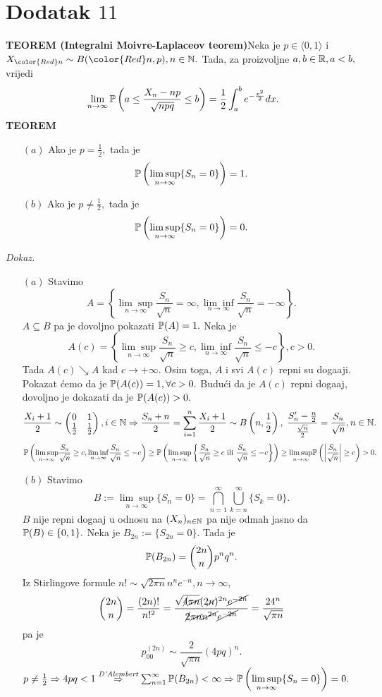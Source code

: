 \documentclass{article}
\newcommand{\mylimsup}{\underset{n\to\infty}{\lim\sup}}
\newcommand{\myliminf}{\underset{n\to\infty}{\lim\inf}}
\begin{document}
\section{Dodatak \(11\)}
\textbf{TEOREM (Integralni Moivre-Laplaceov teorem)}\newline Neka je \(p\in\langle 0,1\rangle\) i \(X_{\color{Red}n}\sim B({\color{Red}n},p),n\in\Bbb N.\) Tada, za proizvoljne \(a,b\in\Bbb R,a<b,\) vrijedi \[\lim_{n\to\infty}\Bbb P\left(a\le\frac{X_n-np}{\sqrt{npq}}\le b\right)=\frac12\int_a^b e^{-\frac{x^2}2}dx.\] 
\textbf{TEOREM}
\begin{enumerate}
    \item[\((a)\)] Ako je \(p=\frac12,\) tada je \[\Bbb P\left(\mylimsup \{S_n=0\}\right)=1.\]
    \item[\((b)\)] Ako je \(p\ne\frac12,\) tada je \[\Bbb P\left(\mylimsup \{S_n=0\}\right)=0.\]
\end{enumerate}
\textit{Dokaz.}\newline
\begin{enumerate}
    \item[\((a)\)] Stavimo \[A=\left\{\mylimsup \frac{S_n}{\sqrt n}=\infty,\myliminf \frac{S_n}{\sqrt n}=-\infty\right\}.\] \(A\subseteq B\) pa je dovoljno pokazati \(\Bbb P(A)=1.\) Neka je \[A(c)=\left\{\mylimsup \frac{S_n}{\sqrt n}\ge c,\myliminf \frac{S_n}{\sqrt n}\le -c\right\},c>0.\] Tada \(A(c)\searrow A\) kad \(c\to+\infty.\) Osim toga, \(A\) i svi \(A(c)\) repni su doga\dj{}aji. Pokazat ćemo da je \(\Bbb P(A(c))=1,\forall c>0.\) Budući da je \(A(c)\) repni doga\dj{}aj, dovoljno je dokazati da je \(\Bbb P(A(c))>0.\) \[\frac{X_i+1}2\sim\begin{pmatrix}0&1\\\frac12&\frac12\end{pmatrix},i\in\Bbb N\Rightarrow\frac{S_n+n}2=\sum_{i=1}^n\frac{X_i+1}2\sim B\left(n,\frac12\right),\;\frac{S_n'-\frac{n}2}{\frac{\sqrt n}2}=\frac{S_n}{\sqrt n},n\in\Bbb N.\] \[\Bbb P\left(\mylimsup \frac{S_n}{\sqrt n}\ge c,\myliminf \frac{S_n}{\sqrt n}\le -c\right)\ge\Bbb P\left(\mylimsup \left\{\frac{S_n}{\sqrt n}\ge c\text{ ili }\frac{S_n}{\sqrt n}\le -c\right\}\right)\ge\mylimsup \Bbb P\left(\left|\frac{S_n}{\sqrt n}\right|\ge c\right)>0.\]
    \item[\((b)\)] Stavimo \[B:=\mylimsup \{S_n=0\}=\bigcap_{n=1}^\infty\bigcup_{k=n}^\infty\{S_k=0\}.\] \(B\) nije repni doga\dj{}aj u odnosu na \((X_n)_{n\in\Bbb N}\) pa nije odmah jasno da \(\Bbb P(B)\in\{0,1\}.\) Neka je \(B_{2n}:=\{S_{2n}=0\}.\) Tada je \[\Bbb P(B_{2n})=\binom{2n}np^nq^n.\] Iz Stirlingove formule \(n!\sim\sqrt{2\pi n}n^ne^{-n},n\to\infty,\) \[\binom{2n}n=\frac{(2n)!}{n!^2}=\frac{\sqrt{\cancel{4}\cancel{\pi n}}(2\cancel{n})^{2n}\cancel{e^{-2n}}}{\cancel{2}\cancel{\pi n}\cancel{n^{2n}}\cancel{e^{-2n}}}=\frac{24^n}{\sqrt{\pi n}}\] pa je \[p_{00}^{(2n)}\sim\frac2{\sqrt{\pi n}}(4pq)^n.\] \(p\ne\frac12\Rightarrow 4pq<1\overset{\textit{D'Alembert}}{\Rightarrow}\sum_{n=1}^\infty\Bbb P(B_{2n})<\infty\Rightarrow\Bbb P\left(\mylimsup \{S_n=0\}\right)=0.\) 
\end{enumerate}
\newpage
\end{document}
